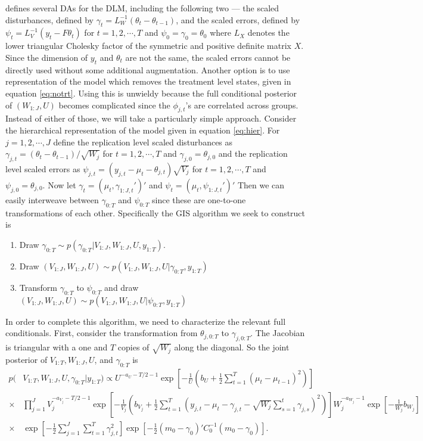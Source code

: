\documentclass[graybox]{svmult}
\begin{document}
\citet{simpson2014interweaving} defines several DAs for the DLM, including the following two --- the scaled disturbances, defined by $\gamma_t = L_W^{-1}(\theta_t - \theta_{t-1})$, and the scaled errors, defined by $\psi_t = L_V^{-1}(y_t - F\theta_t)$ for $t=1,2,\cdots,T$ and $\psi_0=\gamma_0=\theta_0$ where $L_X$ denotes the lower triangular Cholesky factor of the symmetric and positive definite matrix $X$. Since the dimension of $y_t$ and $\theta_t$ are not the same, the scaled errors cannot be directly used without some additional augmentation. Another option is to use representation of the model which removes the treatment level states, given in equation \eqref{eq:notrt}. Using this is unwieldy because the full conditional posterior of $(W_{1:J},U)$ becomes complicated since the $\phi_{j,t}$'s are correlated across groups. Instead of either of those, we will take a particularly simple approach. Consider the hierarchical representation of the model given in equation \eqref{eq:hier}. For $j=1,2,\cdots,J$ define the replication level scaled disturbances as $\gamma_{j,t}=(\theta_t - \theta_{t-1})/\sqrt{W_j}$ for $t=1,2,\cdots,T$ and $\gamma_{j,0}=\theta_{j,0}$ and the replication level scaled errors as $\psi_{j,t}=(y_{j,t} - \mu_t - \theta_{j,t})\sqrt{V_j}$ for $t=1,2,\cdots,T$ and $\psi_{j,0}=\theta_{j,0}$. Now let $\gamma_t=(\mu_t,\gamma_{1:J,t}')'$ and $\psi_t=(\mu_t,\psi_{1:J,t}')'$ Then we can easily interweave between $\gamma_{0:T}$ and $\psi_{0:T}$ since these are one-to-one transformations of each other. Specifically the GIS algorithm we seek to construct is
\begin{enumerate}
\item Draw $\gamma_{0:T} \sim p(\gamma_{0:T}|V_{1:J},W_{1:J},U,y_{1:T})$.
\item Draw $(V_{1:J},W_{1:J},U) \sim p(V_{1:J},W_{1:J},U|\gamma_{0:T},y_{1:T})$
\item Transform $\gamma_{0:T}$ to $\psi_{0:T}$ and draw $(V_{1:J},W_{1:J},U) \sim p(V_{1:J},W_{1:J},U|\psi_{0:T},y_{1:T})$
\end{enumerate}
In order to complete this algorithm, we need to characterize the relevant full conditionals. First, consider the transformation from $\theta_{j,0:T}$ to $\gamma_{j,0:T}$. The Jacobian is triangular with a one and $T$ copies of $\sqrt{W_j}$ along the diagonal. So the joint posterior of $V_{1:T},W_{1:J},U$, and $\gamma_{0:T}$ is
\begin{align*}
p(&V_{1:T},W_{1:J},U,\gamma_{0:T}|y_{1:T}) \propto U^{-a_U-T/2-1}\exp\left[-\frac{1}{U}\left(b_U + \frac{1}{2}\sum_{t=1}^T(\mu_t - \mu_{t-1})^2\right)\right]\\
\times& \prod_{j=1}^JV_j^{-a_{V_j}-T/2-1}\exp\left[-\frac{1}{V_j}\left(b_{V_j} + \frac{1}{2}\sum_{t=1}^T\left(y_{j,t} - \mu_t - \gamma_{j,t} - \sqrt{W_j}\sum_{s=1}^t\gamma_{j,s}\right)^2\right)\right]W_j^{-a_{W_j}-1}\exp\left[-\frac{1}{W_j}b_{W_j}\right]\\
\times&\exp\left[-\frac{1}{2}\sum_{j=1}^J\sum_{t=1}^T\gamma_{j,t}^2\right]\exp\left[-\frac{1}{2}(m_0 - \gamma_0)'C_0^{-1}(m_0 - \gamma_0)\right].
\end{align*}
\end{document}
